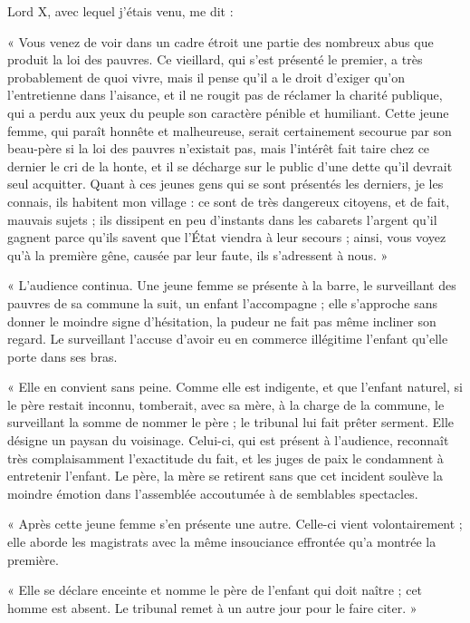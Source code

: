 \documentclass[french,twoside]{book} %
\newenvironment{quoteblock}%
  {\begin{quoting}}
  {\end{quoting}}
\newenvironment{quotebar}{%
    \def\FrameCommand{{\color{rubric!10!}\vrule width 0.5em} \hspace{0.9em}}%
    \def\OuterFrameSep{\itemsep} %
    \MakeFramed {\advance\hsize-\width \FrameRestore}
  }%
  {%
    \endMakeFramed
  }
\renewenvironment{quoteblock}%
  {%
    \savenotes
    \setstretch{0.9}
    \begin{quotebar}
  }
  {%
    \end{quotebar}
    \spewnotes
  }
\begin{document}
\noindent Lord X, avec lequel j’étais venu, me dit :\par

\begin{quoteblock}
 \noindent « Vous venez de voir dans un cadre étroit une partie des nombreux abus que produit la loi des pauvres. Ce vieillard, qui s’est présenté le premier, a très probablement de quoi vivre, mais il pense qu’il a le droit d’exiger qu’on l’entretienne dans l’aisance, et il ne rougit pas de réclamer la charité publique, qui a perdu aux yeux du peuple son caractère pénible et humiliant. Cette jeune femme, qui paraît honnête et malheureuse, serait certainement secourue par son beau-père si la loi des pauvres n’existait pas, mais l’intérêt fait taire chez ce dernier le cri de la honte, et il se décharge sur le public d’une dette qu’il devrait seul acquitter. Quant à ces jeunes gens qui se sont présentés les derniers, je les connais, ils habitent mon village : ce sont de très dangereux citoyens, et de fait, mauvais sujets ; ils dissipent en peu d’instants dans les cabarets l’argent qu’il gagnent parce qu’ils savent que l’État viendra à leur secours ; ainsi, vous voyez qu’à la première gêne, causée par leur faute, ils s’adressent à nous. »
 \end{quoteblock}


\begin{quoteblock}
 \noindent « L'audience continua. Une jeune femme se présente à la barre, le surveillant des pauvres de sa commune la suit, un enfant l’accompagne ; elle s’approche sans donner le moindre signe d’hésitation, la pudeur ne fait pas même incliner son regard. Le surveillant l’accuse d’avoir eu en commerce illégitime l’enfant qu’elle porte dans ses bras.\par
 « Elle en convient sans peine. Comme elle est indigente, et que l’enfant naturel, si le père restait inconnu, tomberait, avec sa mère, à la charge de la commune, le surveillant la somme de nommer le père ; le tribunal lui fait prêter serment. Elle désigne un paysan du voisinage. Celui-ci, qui est présent à l’audience, reconnaît très complaisamment l’exactitude du fait, et les juges de paix le condamnent à entretenir l’enfant. Le père, la mère se retirent sans que cet incident soulève la moindre émotion dans l’assemblée accoutumée à de semblables spectacles.\par
 « Après cette jeune femme s’en présente une autre. Celle-ci vient volontairement ; elle aborde les magistrats avec la même insouciance effrontée qu’a montrée la première.\par
 « Elle se déclare enceinte et nomme le père de l’enfant qui doit naître ; cet homme est absent. Le tribunal remet à un autre jour pour le faire citer. »
 \end{quoteblock}
\end{document}
